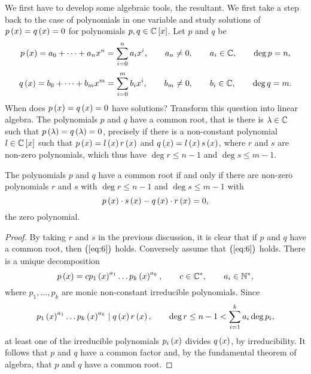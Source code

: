 We first have to develop some algebraic tools, the resultant. We first take a step back to the case of polynomials in one variable and study solutions of $ p\br{x} = q\br{x} = 0 $ for polynomials $ p, q \in \CC\sbr{x} $. Let $ p $ and $ q $ be
$$ p\br{x} = a_0 + \dots + a_nx^n = \sum_{i = 0}^n a_ix^i, \qquad a_n \ne 0, \qquad a_i \in \CC, \qquad \deg p = n, $$
$$ q\br{x} = b_0 + \dots + b_mx^m = \sum_{i = 0}^m b_ix^i, \qquad b_m \ne 0, \qquad b_i \in \CC, \qquad \deg q = m. $$
When does $ p\br{x} = q\br{x} = 0 $ have solutions? Transform this question into linear algebra. The polynomials $ p $ and $ q $ have a common root, that is there is $ \lambda \in \mathbb{C} $ such that $ p\br{\lambda} = q\br{\lambda} = 0 $, precisely if there is a non-constant polynomial $ l \in \CC\sbr{x} $ such that $ p\br{x} = l\br{x}r\br{x} $ and $ q\br{x} = l\br{x}s\br{x} $, where $ r $ and $ s $ are non-zero polynomials, which thus have $ \deg r \le n - 1 $ and $ \deg s \le m - 1 $.

\begin{lemma}
\label{lem:9.1}
The polynomials $ p $ and $ q $ have a common root if and only if there are non-zero polynomials $ r $ and $ s $ with $ \deg r \le n - 1 $ and $ \deg s \le m - 1 $ with
\begin{equation}
\label{eq:6}
p\br{x} \cdot s\br{x} - q\br{x} \cdot r\br{x} = 0,
\end{equation}
the zero polynomial.
\end{lemma}

\begin{proof}
By taking $ r $ and $ s $ in the previous discussion, it is clear that if $ p $ and $ q $ have a common root, then $ \br{\ref{eq:6}} $ holds. Conversely assume that $ \br{\ref{eq:6}} $ holds. There is a unique decomposition
$$ p\br{x} = cp_1\br{x}^{a_1} \dots p_k\br{x}^{a_k}, \qquad c \in \CC^*, \qquad a_i \in \NN^*, $$
where $ p_1, \dots, p_k $ are monic non-constant irreducible polynomials. Since
$$ p_1\br{x}^{a_1} \dots p_k\br{x}^{a_k} \mid q\br{x}r\br{x}, \qquad \deg r \le n - 1 < \sum_{i = 1}^k a_i \deg p_i, $$
at least one of the irreducible polynomials $ p_i\br{x} $ divides $ q\br{x} $, by irreducibility. It follows that $ p $ and $ q $ have a common factor and, by the fundamental theorem of algebra, that $ p $ and $ q $ have a common root.
\end{proof}

\pagebreak

